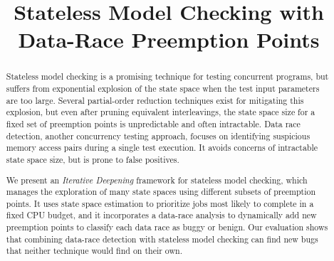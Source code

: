 \documentclass[pldi]{sigplanconf-pldi15}
\begin{document}
%
%

\newcommand\landslide{\textsc{Landslide}}
\newcommand\quicksand{\textsc{Quicksand}}
\newcommand\simics{\textsc{Simics}}
\newcommand{\sect}[1]{\S #1}
\newcommand\hilight[2]{\color{#1}#2\color{black}}

\newcommand\numthrlibs{79}
\newcommand\numpintoses{78} %
\newcommand\numstudence{157} %

\title{Stateless Model Checking with Data-Race Preemption Points}

\maketitle
\begin{abstract}
Stateless model checking is a promising technique for testing concurrent programs,
but suffers from exponential explosion of the state space when the test input parameters are too large.
Several partial-order reduction techniques exist for mitigating this explosion,
but even after pruning equivalent interleavings, the state space size for a fixed set of preemption points is unpredictable and often intractable.
%
Data race detection, another concurrency testing approach, focuses on identifying suspicious memory access pairs during a single test execution.
It avoids concerns of intractable state space size, but is prone to false positives.

We present an {\em Iterative Deepening} framework for stateless model checking,
which manages the exploration of many state spaces using different subsets of preemption points.
It uses state space estimation to prioritize jobs most likely to complete in a fixed CPU budget,
and it incorporates a data-race analysis to dynamically add new preemption points to classify each data race as buggy or benign.
%
Our evaluation shows that combining data-race detection with stateless model checking can find new bugs that neither technique would find on their own.

\end{abstract}
\end{document}
